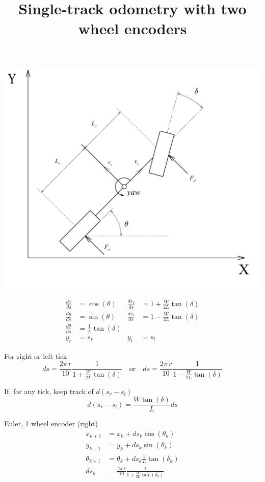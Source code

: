\documentclass{article}
\begin{document}
\title{Single-track odometry with two wheel encoders}
\maketitle

\parbox{.55\textwidth}{%
\begin{center}
  \includegraphics[width=.55\textwidth]{single_track}
\end{center}
}\hfill
\parbox{.4\textwidth}{%
\begin{align*}
  \frac{dx}{ds} &= \cos(\theta) &   \frac{ds_{r}}{ds} &= 1 +
                                                     \frac{W}{2L}\tan(\delta)\\
  \frac{dy}{ds} &= \sin(\theta) & \frac{ds_{l}}{ds} &= 1 -
                                                     \frac{W}{2L}\tan(\delta)\\
  \frac{d\theta}{ds} &= \frac{1}{L}\tan(\delta)\\
  y_{r} &= s_{r} & y_{l} &= s_{l}
\end{align*}}

\noindent For right or left tick
\begin{equation*}
  ds = \frac{2\pi\,r}{10}\frac{1}{1 + \frac{W}{2L}\tan(\delta)}\quad
  \text{or} \quad
  ds = \frac{2\pi\,r}{10}\frac{1}{1 - \frac{W}{2L}\tan(\delta)}
\end{equation*}

If, for any tick, keep track of $d(s_{r}-s_{l})$
\begin{equation*}
  d(s_{r}-s_{l}) = \frac{W\tan(\delta)}{L}ds
\end{equation*}

Euler, 1 wheel encoder (right)
\begin{align*}
  x_{k+1} &= x_{k} + ds_{k}\cos(\theta_{k})\\
  y_{k+1} &= y_{k} + ds_{k}\sin(\theta_{k})\\
  \theta_{k+1} &= \theta_{k} + ds_{k}\frac{1}{L}\tan(\delta_{k})\\
  ds_{k} &= \frac{2\pi\,r}{10}\frac{1}{1 + \frac{W}{2L}\tan(\delta_{k})}  
\end{align*}
\end{document}
